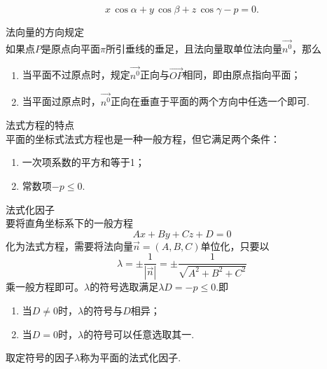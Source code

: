 \begin{enumerate}[\large1.]
\begin{enumerate}[]
\begin{equation}
		x\,\cos \alpha +y\,\cos \beta +z\,\cos \gamma-p=0.
		\end{equation}
	\end{enumerate}
	{\color{dy}法向量的方向规定}\\
	\hspace*{0.7cm} 如果点$P$是原点向平面$\pi $所引垂线的垂足，且法向量取单位法向量$\overrightarrow{n^0}$，那么
	\begin{enumerate}[(1)]
		\setlength{\itemindent}{3em}
		\setlength{\topsep}{0.01em}
		\setlength{\itemsep}{0.01em}
		\item 当平面不过原点时，规定$\overrightarrow{n^0}$正向与$\overrightarrow{OP}$相同，即{\color{dl}由原点指向平面}；
		\item 当平面过原点时，$\overrightarrow{n^0}$正向在垂直于平面的两个方向中{\color{dl}任选一个}即可.
	\end{enumerate}
	{\color{dy}法式方程的特点}\\
	\hspace*{0.7cm} 平面的坐标式法式方程也是一种一般方程，但它满足两个条件：
	\begin{enumerate}[(1)]
		\setlength{\itemindent}{3em}
		\setlength{\topsep}{0.01em}
		\setlength{\itemsep}{0.01em}
		\item 一次项系数的平方和等于1；
		\item 常数项$-p \le 0$.
	\end{enumerate}
	{\color{dy}法式化因子}\\
	\hspace*{0.7cm} 要将直角坐标系下的一般方程
	\begin{equation*}
	Ax+By+Cz+D=0
	\end{equation*}
	化为法式方程，需要将法向量$\overrightarrow{n}=(A,B,C)$单位化，只要以
	\begin{equation}
	\lambda =\pm \frac{1}{|\overrightarrow{n}|}=\pm \frac{1}{\sqrt{A^2+B^2+C^2}}
	\end{equation}
	乘一般方程即可。$\lambda $的符号选取满足$\lambda D=-p \le 0.$即
	\begin{enumerate}[(1)]
		\setlength{\itemindent}{3em}
		\setlength{\topsep}{0.01em}
		\setlength{\itemsep}{0.01em}
		\item 当$D \neq 0$时，$\lambda $的符号与$D$相异；
		\item 当$D = 0$时，$\lambda $的符号可以任意选取其一.
	\end{enumerate}
	取定符号的因子$\lambda $称为平面的法式化因子.
\end{enumerate}
